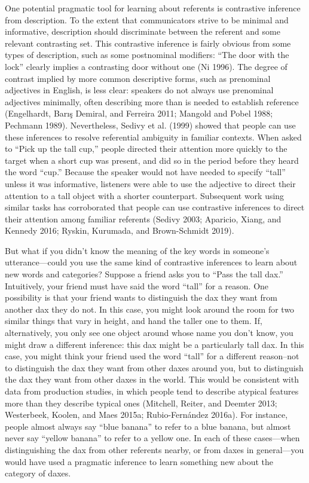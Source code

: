 \documentclass{ucetd}
\begin{document}
One potential pragmatic tool for learning about referents is contrastive
inference from description. To the extent that communicators strive to
be minimal and informative, description should discriminate between the
referent and some relevant contrasting set. This contrastive inference
is fairly obvious from some types of description, such as some
postnominal modifiers: ``The door with the lock'' clearly implies a
contrasting door without one (Ni 1996). The degree of contrast implied
by more common descriptive forms, such as prenominal adjectives in
English, is less clear: speakers do not always use prenominal adjectives
minimally, often describing more than is needed to establish reference
(Engelhardt, Barış Demiral, and Ferreira 2011; Mangold and Pobel 1988;
Pechmann 1989). Nevertheless, Sedivy et al. (1999) showed that people
can use these inferences to resolve referential ambiguity in familiar
contexts. When asked to ``Pick up the tall cup,'' people directed their
attention more quickly to the target when a short cup was present, and
did so in the period before they heard the word ``cup.'' Because the
speaker would not have needed to specify ``tall'' unless it was
informative, listeners were able to use the adjective to direct their
attention to a tall object with a shorter counterpart. Subsequent work
using similar tasks has corroborated that people can use contrastive
inferences to direct their attention among familiar referents (Sedivy
2003; Aparicio, Xiang, and Kennedy 2016; Ryskin, Kurumada, and
Brown-Schmidt 2019).

But what if you didn't know the meaning of the key words in someone's
utterance---could you use the same kind of contrastive inferences to
learn about new words and categories? Suppose a friend asks you to
``Pass the tall dax.'' Intuitively, your friend must have said the word
``tall'' for a reason. One possibility is that your friend wants to
distinguish the dax they want from another dax they do not. In this
case, you might look around the room for two similar things that vary in
height, and hand the taller one to them. If, alternatively, you only see
one object around whose name you don't know, you might draw a different
inference: this dax might be a particularly tall dax. In this case, you
might think your friend used the word ``tall'' for a different
reason--not to distinguish the dax they want from other daxes around
you, but to distinguish the dax they want from other daxes in the world.
This would be consistent with data from production studies, in which
people tend to describe atypical features more than they describe
typical ones (Mitchell, Reiter, and Deemter 2013; Westerbeek, Koolen,
and Maes 2015a; Rubio-Fernández 2016a). For instance, people almost
always say ``blue banana'' to refer to a blue banana, but almost never
say ``yellow banana'' to refer to a yellow one. In each of these
cases---when distinguishing the dax from other referents nearby, or from
daxes in general---you would have used a pragmatic inference to learn
something new about the category of daxes.
\end{document}
